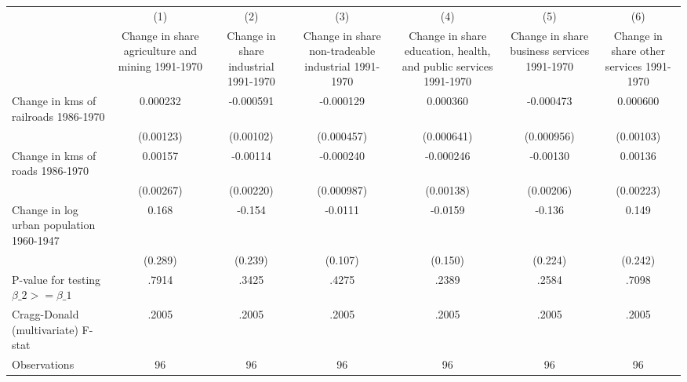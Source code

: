 {
\def\sym#1{\ifmmode^{#1}\else\(^{#1}\)\fi}
\begin{tabular}{l*{6}{c}}
\hline\hline
                &\multicolumn{1}{c}{(1)}&\multicolumn{1}{c}{(2)}&\multicolumn{1}{c}{(3)}&\multicolumn{1}{c}{(4)}&\multicolumn{1}{c}{(5)}&\multicolumn{1}{c}{(6)}\\
                &\multicolumn{1}{c}{Change in share agriculture and mining 1991-1970}&\multicolumn{1}{c}{Change in share industrial 1991-1970}&\multicolumn{1}{c}{Change in share non-tradeable industrial 1991-1970}&\multicolumn{1}{c}{Change in share education, health, and public services 1991-1970}&\multicolumn{1}{c}{Change in share business services 1991-1970}&\multicolumn{1}{c}{Change in share other services 1991-1970}\\
\hline
Change in kms of railroads 1986-1970& 0.000232         &-0.000591         &-0.000129         & 0.000360         &-0.000473         & 0.000600         \\
                &(0.00123)         &(0.00102)         &(0.000457)         &(0.000641)         &(0.000956)         &(0.00103)         \\
[1em]
Change in kms of roads 1986-1970&  0.00157         & -0.00114         &-0.000240         &-0.000246         & -0.00130         &  0.00136         \\
                &(0.00267)         &(0.00220)         &(0.000987)         &(0.00138)         &(0.00206)         &(0.00223)         \\
[1em]
Change in log urban population 1960-1947&    0.168         &   -0.154         &  -0.0111         &  -0.0159         &   -0.136         &    0.149         \\
                &  (0.289)         &  (0.239)         &  (0.107)         &  (0.150)         &  (0.224)         &  (0.242)         \\
\hline
P-value for testing $\beta\_{2} >= \beta\_{1}$&    .7914         &    .3425         &    .4275         &    .2389         &    .2584         &    .7098         \\
Cragg-Donald (multivariate) F-stat&    .2005         &    .2005         &    .2005         &    .2005         &    .2005         &    .2005         \\
Observations    &       96         &       96         &       96         &       96         &       96         &       96         \\
\hline\hline
\end{tabular}
}

